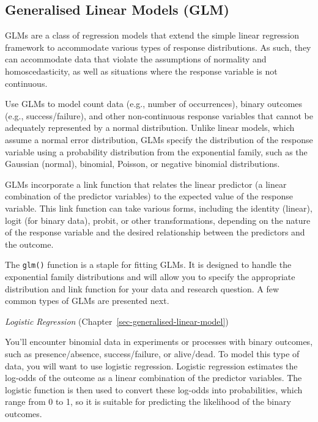\documentclass[
  letterpaper,
]{book}
\begin{document}
\subsection{Generalised Linear Models
(GLM)}\label{generalised-linear-models-glm}

GLMs are a class of regression models that extend the simple linear
regression framework to accommodate various types of response
distributions. As such, they can accommodate data that violate the
assumptions of normality and homoscedasticity, as well as situations
where the response variable is not continuous.

Use GLMs to model count data (e.g., number of occurrences), binary
outcomes (e.g., success/failure), and other non-continuous response
variables that cannot be adequately represented by a normal
distribution. Unlike linear models, which assume a normal error
distribution, GLMs specify the distribution of the response variable
using a probability distribution from the exponential family, such as
the Gaussian (normal), binomial, Poisson, or negative binomial
distributions.

GLMs incorporate a link function that relates the linear predictor (a
linear combination of the predictor variables) to the expected value of
the response variable. This link function can take various forms,
including the identity (linear), logit (for binary data), probit, or
other transformations, depending on the nature of the response variable
and the desired relationship between the predictors and the outcome.

The \texttt{glm()} function is a staple for fitting GLMs. It is designed
to handle the exponential family distributions and will allow you to
specify the appropriate distribution and link function for your data and
research question. A few common types of GLMs are presented next.

\emph{Logistic Regression} (Chapter~\ref{sec-generalised-linear-model})

You'll encounter binomial data in experiments or processes with binary
outcomes, such as presence/absence, success/failure, or alive/dead. To
model this type of data, you will want to use logistic regression.
Logistic regression estimates the log-odds of the outcome as a linear
combination of the predictor variables. The logistic function is then
used to convert these log-odds into probabilities, which range from 0 to
1, so it is suitable for predicting the likelihood of the binary
outcomes.
\end{document}
